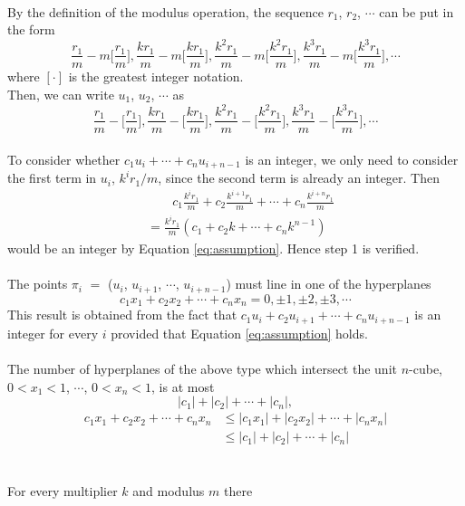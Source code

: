\documentclass[12pt,a4paper]{article}
\begin{document}
\\
By the definition of the modulus operation, the sequence $r_1$, $r_2$, $\cdots$ can be put in the form
\begin{equation*}
\frac{r_1}{m} - m\Big[\frac{r_1}{m}\Big], \frac{kr_1}{m} - m\Big[\frac{kr_1}{m}\Big], \frac{k^2r_1}{m} - m\Big[\frac{k^2r_1}{m}\Big], \frac{k^3r_1}{m} - m\Big[\frac{k^3r_1}{m}\Big], \cdots 
\end{equation*}
where $[\cdot]$ is the greatest integer notation.
\\
Then, we can write $u_1$, $u_2$, $\cdots$ as 
$$
\frac{r_1}{m} - \Big[\frac{r_1}{m}\Big], \frac{kr_1}{m} - \Big[\frac{kr_1}{m}\Big], \frac{k^2r_1}{m} - \Big[\frac{k^2r_1}{m}\Big], \frac{k^3r_1}{m} - \Big[\frac{k^3r_1}{m}\Big], \cdots 
$$
\\
To consider whether $c_1u_i + \cdots + c_nu_{i+n-1}$ is an integer, we only need to consider the first term in $u_i$, $k^ir_1/m$, since the second term is already an integer. Then
\begin{align*}
&\qquad c_1\frac{k^ir_1}{m} + c_{2}\frac{k^{i+1}r_1}{m} + \cdots + c_{n}\frac{k^{i+n}r_1}{m}\\
&=\frac{k^ir_1}{m}(c_1 + c_2k + \cdots + c_nk^{n-1})
\end{align*}
would be an integer by Equation \ref{eq:assumption}. Hence step 1 is verified.
\\\\

The points $\pi_i$ $=$ ($u_i$, $u_{i+1}$, $\cdots$, $u_{i+n-1}$) must line in one of the hyperplanes
$$
c_1x_1 + c_2x_2 + \cdots + c_nx_n = 0, \pm1, \pm2, \pm3, \cdots
$$
This result is obtained from the fact that $c_1u_i + c_2u_{i+1} + \cdots + c_nu_{i+n-1}$ is an integer for every $i$ provided that Equation \ref{eq:assumption} holds.
\\\\
The number of hyperplanes of the above type which intersect the unit $n$-cube, $0<x_1<1$, $\cdots$, $0 < x_n < 1$, is at most
$$
|c_1| + |c_2| + \cdots + |c_n|,
$$
\begin{align*}
c_1x_1 + c_2x_2 + \cdots + c_nx_n &\leq |c_1x_1| + |c_2x_2| + \cdots + |c_nx_n|\\
&\leq  |c_1| + |c_2| + \cdots + |c_n|
\end{align*}
\\\\
For every multiplier $k$ and modulus $m$ there 
\end{document}
